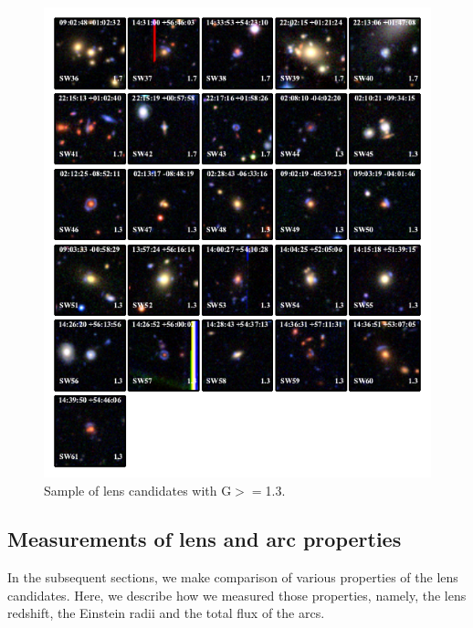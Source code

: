 \documentclass[useAMS,usenatbib,a4paper]{mn2e}
\begin{document}
\begin{figure}
\begin{center}
\includegraphics[scale=1.9]{sw-cfhtls-figs/lenscandfin_1.pdf}
\caption{ \label{fig:lc}
Sample of lens candidates with G$>=$1.3.
}
\end{center}
\end{figure}

\subsection{Measurements of lens and arc properties}
\label{sec:results:meas}

In the subsequent sections, we make comparison of various properties of
the lens candidates. Here, we describe how we measured those properties,
namely, the lens redshift, the Einstein radii and the total flux of the
arcs.
\end{document}
